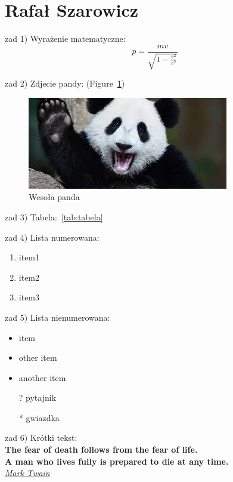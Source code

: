\section{Rafał Szarowicz}
zad 1) Wyrażenie matematyczne: \[p=\frac{mv}{\sqrt{1-\frac{v^2}{c^2}}}\]

zad 2) Zdjecie pandy: (Figure~\ref{fig:panda})
\begin{figure} [htbp]
    \centering
    \includegraphics[scale=0.7]{pictures/panda.jpg}
    \caption{Wesoła panda}
    \label{fig:panda}
\end{figure}


zad 3) Tabela:~\ref{tab:tabela}



zad 4) Lista numerowana:
\begin{enumerate}
    \item item1
    \item item2
    \item item3
\end{enumerate}

zad 5) Lista nienumerowana:
\begin{itemize}
    \item item
    \item other item
    \item another item
    \item[?] pytajnik
    \item[*] gwiazdka
\end{itemize}
 
 zad 6) Krótki tekst:\\
 \textbf{The fear of death follows from the fear of life.\\ A man who lives fully is prepared to die at any time.}\\{\textit{\underline{Mark Twain}}}\\
 